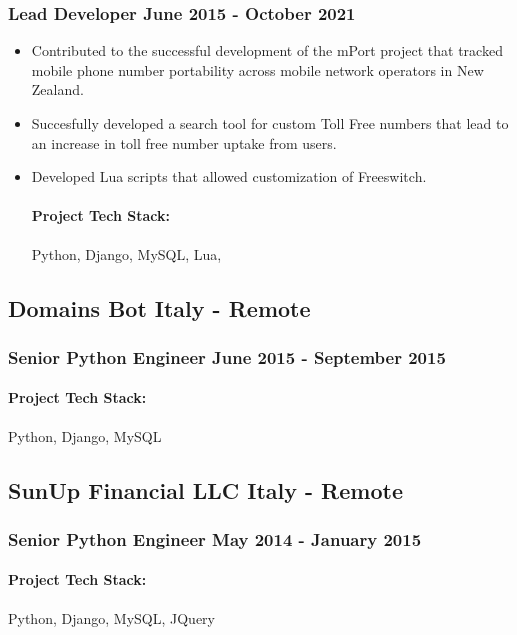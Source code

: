 \documentclass[11pt]{article} %
\begin{document}
\subsubsection{Lead Developer \hfill  June 2015 - October 2021}
\begin{itemize}
    \item Contributed to the successful development of the mPort project that tracked mobile phone number portability across mobile network operators in New Zealand.
    \item Succesfully developed a search tool for custom Toll Free numbers that lead to an increase in toll free number uptake from users.
    \item Developed Lua scripts that allowed customization of Freeswitch. 

    \paragraph{Project Tech Stack:} Python, Django, MySQL, Lua,
\end{itemize}

\subsection{Domains Bot \hfill Italy - Remote}
\subsubsection{Senior Python Engineer \hfill  June 2015 - September 2015}
\begin{itemize}
    \paragraph{Project Tech Stack:} Python, Django, MySQL
\end{itemize}

\subsection{SunUp Financial LLC \hfill Italy - Remote}
\subsubsection{Senior Python Engineer \hfill  May 2014 - January 2015}
\begin{itemize}
    \paragraph{Project Tech Stack:} Python, Django, MySQL, JQuery
\end{itemize}
\end{document}

